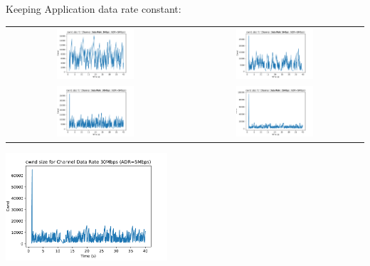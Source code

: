\documentclass[12pt]{article}
\begin{document}
Keeping Application data rate constant:

\begin{center}
    \begin{tabular}{c c}
        \includegraphics[width=0.45\textwidth]{../Q2/const_adr_3Mbps.pdf} & 
        \includegraphics[width=0.45\textwidth]{../Q2/const_adr_5Mbps.pdf} \\
        \includegraphics[width=0.45\textwidth]{../Q2/const_adr_10Mbps.pdf} &
        \includegraphics[width=0.45\textwidth]{../Q2/const_adr_15Mbps.pdf} \\
    \end{tabular}
        \includegraphics[width=0.45\textwidth]{../Q2/const_adr_30Mbps.pdf} 
\end{center}
\end{document}
